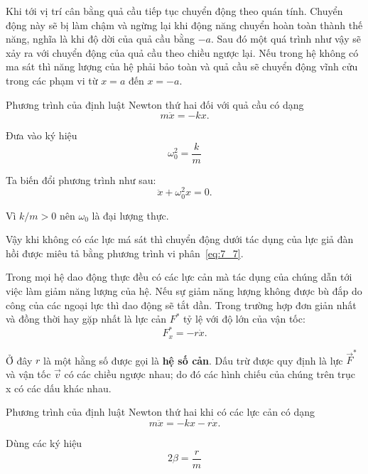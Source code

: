  Khi tới vị trí cân bằng quả cầu tiếp tục chuyển động theo quán tính. Chuyển động này sẽ bị làm chậm và ngừng lại khi động năng chuyển hoàn toàn thành thế năng, nghĩa là khi độ dời của quả cầu bằng $-a$. Sau đó một quá trình như vậy sẽ xảy ra với chuyển động của quả cầu theo chiều ngược lại. Nếu trong hệ không có ma sát thì năng lượng của hệ phải bảo toàn và quả cầu sẽ chuyển động vĩnh cửu trong các phạm vi từ $x=a$ đến $x=-a$.

Phương trình của định luật Newton thứ hai đối với quả cầu có dạng
\begin{equation}\label{eq:7_5}
	m\ddot{x} = -kx.
\end{equation}

\noindent
Đưa vào ký hiệu
\begin{equation}\label{eq:7_6}
	\omega_0^2 = \frac{k}{m}
\end{equation}

\noindent
Ta biến đổi phương trình  như sau:
\begin{equation}\label{eq:7_7}
	\ddot{x} + \omega_0^2 x = 0.
\end{equation}

\noindent
Vì $k/m>0$ nên $\omega_0$ là đại lượng thực.

Vậy khi không có các lực má sát thì chuyển động dưới tác dụng của lực giả đàn hồi được miêu tả bằng phương trình vi phân~\eqref{eq:7_7}.

Trong mọi hệ dao động thực đều có các lực cản mà tác dụng của chúng dẫn tới việc làm giảm năng lượng của hệ. Nếu sự giảm năng lượng không được bù đắp do công của các ngoại lực thì dao động sẽ tắt dần. Trong trường hợp đơn giản nhất và đồng thời hay gặp nhất là lực cản $F^*$ tỷ lệ với độ lớn của vận tốc:
\begin{equation}\label{eq:7_8}
	F_x^* = -r\dot{x}.
\end{equation}

\noindent
Ở đây $r$ là một hằng số được gọi là \textbf{hệ số cản}. Dấu trừ được quy định là lực $\vec{F}^*$ và vận tốc $\vec{v}$ có các chiều ngược nhau; do đó các hình chiếu của chúng trên trục x có các dấu khác nhau.

Phương trình của định luật Newton thứ hai khi có các lực cản có dạng
\begin{equation}\label{eq:7_9}
	m\ddot{x} = -kx - r\dot{x}.
\end{equation}

\noindent
Dùng các ký hiệu
\begin{equation}\label{eq:7_10}
	2\beta = \frac{r}{m}
\end{equation}

